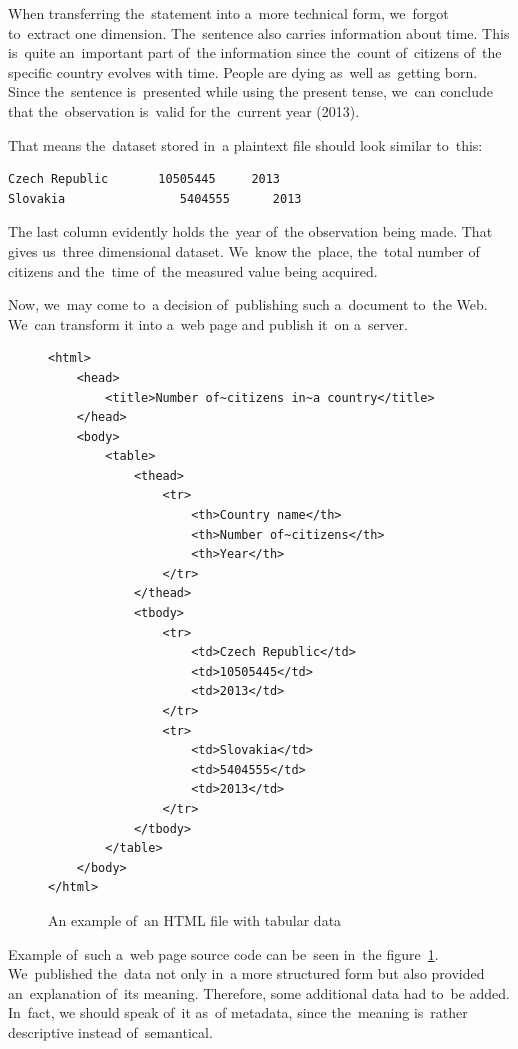 When transferring the~statement into a~more technical form, we~forgot to~extract one
dimension. The~sentence also carries information about time. This is~quite an~important
part of~the information since the~count of~citizens of~the specific country evolves with time.
People are dying as~well as~getting born. Since the~sentence is~presented while using the
present tense, we~can conclude that the~observation is~valid for the~current year (2013).

That means the~dataset stored in~a plaintext file should look similar to~this:

\begin{verbatim}
Czech Republic       10505445     2013
Slovakia	            5404555      2013
\end{verbatim}

The last column evidently holds the~year of~the observation being made.
That gives us~three dimensional dataset. We~know the~place, the~total number of
citizens and the~time of~the measured value being acquired.

Now, we~may come to~a decision of~publishing such a~document to~the Web. We~can transform
it into a~web page and publish it~on a~server.
\begin{figure}
\small\begin{verbatim}
<html>
    <head>
        <title>Number of~citizens in~a country</title>
    </head>
    <body>
        <table>
            <thead>
                <tr>
                    <th>Country name</th>
                    <th>Number of~citizens</th>
                    <th>Year</th>
                </tr>
            </thead>
            <tbody>
                <tr>
                    <td>Czech Republic</td>
                    <td>10505445</td>
                    <td>2013</td>
                </tr>
                <tr>
                    <td>Slovakia</td>
                    <td>5404555</td>
                    <td>2013</td>
                </tr>
            </tbody>
        </table>
    </body>
</html>
\end{verbatim}\normalsize
\caption{An example of~an HTML file with tabular data}
\label{fig:rdf-html-01}
\end{figure}

Example of~such a~web page source code can be~seen in~the 
figure~\ref{fig:rdf-html-01}. We~published the~data not only in~a more structured form but also
provided an~explanation of~its meaning. Therefore, some additional data had to~be added. In~fact, we
should speak of~it as~of metadata, since the~meaning is~rather descriptive instead of~semantical.


